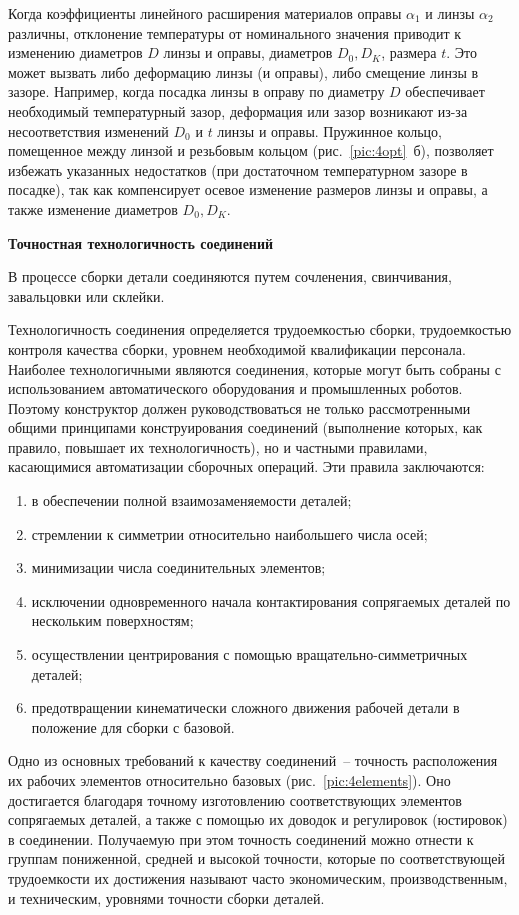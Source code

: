 Когда коэффициенты линейного расширения материалов оправы $ \alpha_1 $ и линзы $ \alpha_2 $ различны, отклонение температуры от номинального значения приводит к изменению диаметров $ D $ линзы и оправы, диаметров $ D_0, D_K $, размера $ t $. Это может вызвать либо деформацию линзы (и оправы), либо смещение линзы в зазоре. Например, когда посадка линзы в оправу по диаметру $ D $ обеспечивает необходимый температурный зазор, деформация или зазор возникают из-за несоответствия изменений $ D_0 $ и $ t $ линзы и оправы. Пружинное кольцо, помещенное между линзой и резьбовым кольцом (рис.~\ref{pic:4opt}~б), позволяет избежать указанных недостатков (при достаточном температурном зазоре в посадке), так как компенсирует осевое изменение размеров линзы и оправы, а также изменение диаметров $ D_0, D_K $.

\begin{flushleft}
\textbf{Точностная технологичность соединений}
\end{flushleft}

В процессе сборки детали соединяются путем сочленения, свинчивания, завальцовки или склейки.

Технологичность соединения определяется трудоемкостью сборки, трудоемкостью контроля качества сборки, уровнем необходимой квалификации персонала.
Наиболее технологичными являются соединения, которые могут быть собраны с использованием автоматического оборудования и промышленных роботов. Поэтому конструктор должен руководствоваться не только рассмотренными общими принципами конструирования соединений (выполнение которых, как правило, повышает их технологичность), но и частными правилами, касающимися автоматизации сборочных операций. Эти правила заключаются:
\begin{enumerate}
	\item в обеспечении полной взаимозаменяемости деталей;
	\item стремлении к симметрии относительно наибольшего числа осей;
	\item минимизации числа соединительных элементов;
	\item исключении одновременного начала контактирования сопрягаемых деталей по нескольким поверхностям;
	\item осуществлении центрирования с помощью вращательно-симметричных деталей;
	\item предотвращении кинематически сложного движения рабочей детали в положение для сборки с базовой.
\end{enumerate}

Одно из основных требований к качеству соединений~-- точность расположения их рабочих элементов относительно базовых (рис.~\ref{pic:4elements}). Оно достигается благодаря точному изготовлению соответствующих элементов сопрягаемых деталей, а также с помощью их доводок и регулировок (юстировок) в соединении. Получаемую при этом точность соединений можно отнести к группам пониженной, средней и высокой точности, которые по соответствующей трудоемкости их достижения называют часто экономическим, производственным, и техническим, уровнями точности сборки деталей.

